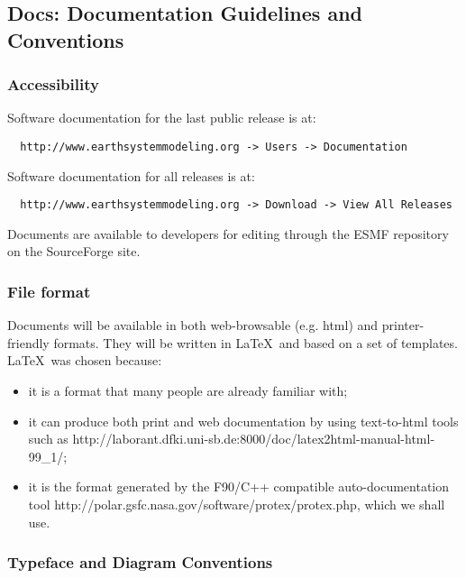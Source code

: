 \subsection{Docs: Documentation Guidelines and Conventions}
\label{sec:docguidelines}

\subsubsection{Accessibility}

Software documentation for the last public release is at:
\begin{verbatim}
  http://www.earthsystemmodeling.org -> Users -> Documentation
\end{verbatim} 

Software documentation for all releases is at:
\begin{verbatim}
  http://www.earthsystemmodeling.org -> Download -> View All Releases
\end{verbatim}

Documents are available to developers for editing through the
ESMF repository on the SourceForge site.

\subsubsection{File format}

Documents will be available in both web-browsable (e.g. html) and
printer-friendly formats.  They will be written in \LaTeX\ and based on a
set of templates. \LaTeX\ was chosen because:

\begin{itemize}
\item it is a format that many people are already familiar with; 
\item it can produce both print and web documentation by using text-to-html
tools such as  
{http://laborant.dfki.uni-sb.de:8000/doc/latex2html-manual-html-99\_1/};
\item it is the format generated by the F90/C++ compatible 
auto-documentation tool 
{http://polar.gsfc.nasa.gov/software/protex/protex.php}\cite{protex}, 
which we shall use.
\end{itemize}

\subsubsection{Typeface and Diagram Conventions}

